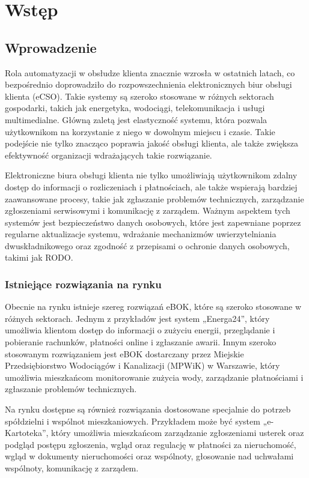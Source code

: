 \chapter{Wstęp}
\section{Wprowadzenie}
Rola automatyzacji w obsłudze klienta znacznie wzrosła w ostatnich latach, co bezpośrednio doprowadziło do rozpowszechnienia elektronicznych biur obsługi klienta (eCSO). Takie systemy są szeroko stosowane w różnych sektorach gospodarki, takich jak energetyka, wodociągi, telekomunikacja i usługi multimedialne. Główną zaletą jest elastyczność systemu, która pozwala użytkownikom na korzystanie z niego w dowolnym miejscu i czasie. Takie podejście nie tylko znacząco poprawia jakość obsługi klienta, ale także zwiększa efektywność organizacji wdrażających takie rozwiązanie.

Elektroniczne biura obsługi klienta nie tylko umożliwiają użytkownikom zdalny dostęp do informacji o rozliczeniach i płatnościach, ale także wspierają bardziej zaawansowane procesy, takie jak zgłaszanie problemów technicznych, zarządzanie zgłoszeniami serwisowymi i komunikację z zarządem. Ważnym aspektem tych systemów jest bezpieczeństwo danych osobowych, które jest zapewniane poprzez regularne aktualizacje systemu, wdrażanie mechanizmów uwierzytelniania dwuskładnikowego oraz zgodność z przepisami o ochronie danych osobowych, takimi jak RODO.



\subsection{Istniejące rozwiązania na rynku}

Obecnie na rynku istnieje szereg rozwiązań eBOK, które są szeroko stosowane w różnych sektorach. Jednym z przykładów jest system „Energa24”, który umożliwia klientom dostęp do informacji o zużyciu energii, przeglądanie i pobieranie rachunków, płatności online i zgłaszanie awarii. Innym szeroko stosowanym rozwiązaniem jest eBOK dostarczany przez Miejskie Przedsiębiorstwo Wodociągów i Kanalizacji (MPWiK) w Warszawie, który umożliwia mieszkańcom monitorowanie zużycia wody, zarządzanie płatnościami i zgłaszanie problemów technicznych.

Na rynku dostępne są również rozwiązania dostosowane specjalnie do potrzeb spółdzielni i wspólnot mieszkaniowych. Przykładem może być system „e-Kartoteka”, który umożliwia mieszkańcom zarządzanie zgłoszeniami usterek oraz podgląd postępu zgłoszenia, wgląd oraz regulację w płatności za nieruchomość, wgląd w dokumenty nieruchomości oraz wspólnoty, głosowanie nad uchwałami wspólnoty, komunikację z zarządem. 

